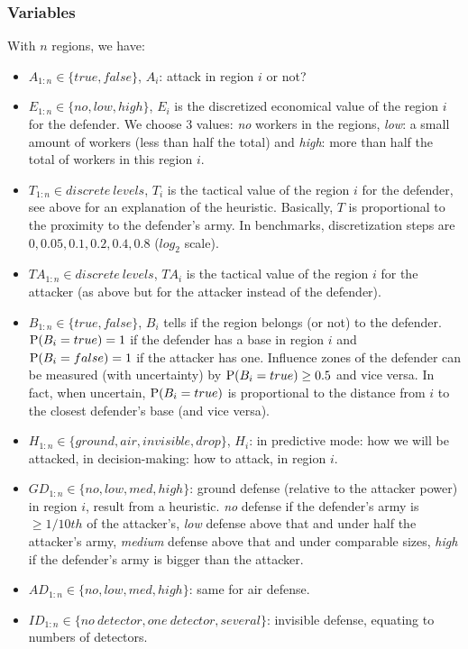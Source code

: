 \subsubsection{Variables}
With $n$ regions, we have: 
\begin{itemize}
    \item $A_{1:n} \in \{true,false\}$, $A_i$: attack in region $i$ or not?
    \item $E_{1:n} \in \{no, low, high\}$, $E_i$ is the discretized economical value of the region $i$ for the defender. We choose 3 values: \textit{no} workers in the regions, \textit{low}: a small amount of workers (less than half the total) and \textit{high}: more than half the total of workers in this region $i$.
    \item $T_{1:n} \in discrete\ levels$, $T_i$ is the tactical value of the region $i$ for the defender, see above for an explanation of the heuristic. Basically, $T$ is proportional to the proximity to the defender's army. In benchmarks, discretization steps are $0,0.05,0.1,0.2,0.4,0.8$ ($log_2$ scale).
    \item $TA_{1:n} \in discrete\ levels$, $TA_i$ is the tactical value of the region $i$ for the attacker (as above but for the attacker instead of the defender).
    \item $B_{1:n} \in \{true, false\}$, $B_i$ tells if the region belongs (or not) to the defender. $\mathrm{P}(B_i=true)=1$ if the defender has a base in region $i$ and $\mathrm{P}(B_i=false)=1$ if the attacker has one. Influence zones of the defender can be measured (with uncertainty) by $\mathrm{P}(B_i=true) \geq 0.5$ and vice versa. In fact, when uncertain, $\mathrm{P}(B_i=true)$ is proportional to the distance from $i$ to the closest defender's base (and vice versa). 
    \item $H_{1:n} \in \{ground, air, invisible, drop\}$, $H_i$: in predictive mode: how we will be attacked, in decision-making: how to attack, in region $i$.
    \item $GD_{1:n} \in \{no, low, med, high\}$: ground defense (relative to the attacker power) in region $i$, result from a heuristic. \textit{no} defense if the defender's army is $\geq 1/10th$ of the attacker's, \textit{low} defense above that and under half the attacker's army, \textit{medium} defense above that and under comparable sizes, \textit{high} if the defender's army is bigger than the attacker.
    \item $AD_{1:n} \in \{no, low, med, high\}$: same for air defense.
    \item $ID_{1:n} \in \{no\ detector, one\ detector, several\}$: invisible defense, equating to numbers of detectors.

\end{itemize}
